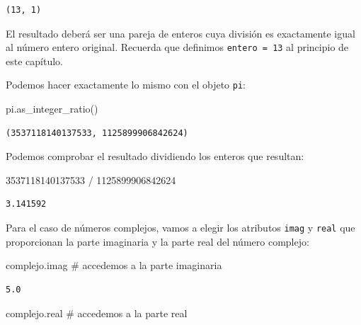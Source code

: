 \documentclass[
  spanish,
  letterpaper,
]{scrbook}
\newenvironment{Shaded}{\begin{snugshade}}{\end{snugshade}}
\newcommand{\CommentTok}[1]{\textcolor[rgb]{0.37,0.37,0.37}{#1}}
\newcommand{\DecValTok}[1]{\textcolor[rgb]{0.68,0.00,0.00}{#1}}
\newcommand{\NormalTok}[1]{\textcolor[rgb]{0.00,0.23,0.31}{#1}}
\newcommand{\OperatorTok}[1]{\textcolor[rgb]{0.37,0.37,0.37}{#1}}
\theoremstyle{definition}
\theoremstyle{remark}
\begin{document}
\begin{verbatim}
(13, 1)
\end{verbatim}

El resultado deberá ser una pareja de enteros cuya división es
exactamente igual al número entero original. Recuerda que definimos
\texttt{entero\ =\ 13} al principio de este capítulo.

Podemos hacer exactamente lo mismo con el objeto \texttt{pi}:

\begin{Shaded}
\begin{Highlighting}[]
\NormalTok{pi.as\_integer\_ratio()}
\end{Highlighting}
\end{Shaded}

\begin{verbatim}
(3537118140137533, 1125899906842624)
\end{verbatim}

Podemos comprobar el resultado dividiendo los enteros que resultan:

\begin{Shaded}
\begin{Highlighting}[]
\DecValTok{3537118140137533} \OperatorTok{/} \DecValTok{1125899906842624}
\end{Highlighting}
\end{Shaded}

\begin{verbatim}
3.141592
\end{verbatim}

Para el caso de números complejos, vamos a elegir los atributos
\texttt{imag} y \texttt{real} que proporcionan la parte imaginaria y la
parte real del número complejo:

\begin{Shaded}
\begin{Highlighting}[]
\NormalTok{complejo.imag }\CommentTok{\# accedemos a la parte imaginaria}
\end{Highlighting}
\end{Shaded}

\begin{verbatim}
5.0
\end{verbatim}

\begin{Shaded}
\begin{Highlighting}[]
\NormalTok{complejo.real }\CommentTok{\# accedemos a la parte real}
\end{Highlighting}
\end{Shaded}
\end{document}
